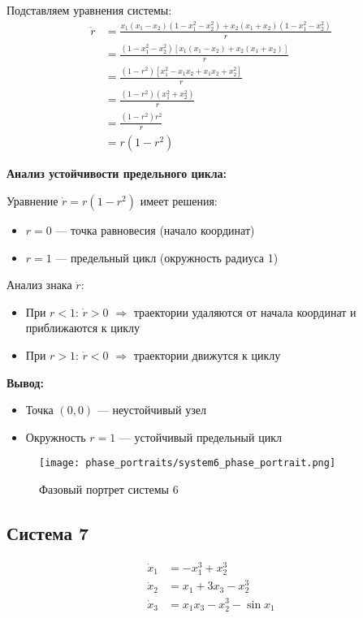 Подставляем уравнения системы:
\begin{align}
\dot{r} &= \frac{x_1(x_1 - x_2)(1 - x_1^2 - x_2^2) + x_2(x_1 + x_2)(1 - x_1^2 - x_2^2)}{r} \\\
&= \frac{(1 - x_1^2 - x_2^2)[x_1(x_1 - x_2) + x_2(x_1 + x_2)]}{r} \\\
&= \frac{(1 - r^2)[x_1^2 - x_1x_2 + x_1x_2 + x_2^2]}{r} \\\
&= \frac{(1 - r^2)(x_1^2 + x_2^2)}{r} \\\
&= \frac{(1 - r^2)r^2}{r} \\\
&= r(1 - r^2)
\end{align}

\textbf{Анализ устойчивости предельного цикла:}

Уравнение $\dot{r} = r(1 - r^2)$ имеет решения:
\begin{itemize}
\item $r = 0$ --- точка равновесия (начало координат)
\item $r = 1$ --- предельный цикл (окружность радиуса 1)
\end{itemize}

Анализ знака $\dot{r}$:
\begin{itemize}
\item При $r < 1$: $\dot{r} > 0$ $\Rightarrow$ траектории удаляются от начала координат и приближаются к циклу
\item При $r > 1$: $\dot{r} < 0$ $\Rightarrow$ траектории движутся к циклу
\end{itemize}

\textbf{Вывод:}
\begin{itemize}
\item Точка $(0,0)$ --- неустойчивый узел
\item Окружность $r = 1$ --- устойчивый предельный цикл
\end{itemize}

\begin{figure}[H]
\centering
\texttt{[image: phase\_portraits/system6\_phase\_portrait.png]}
\caption{Фазовый портрет системы 6}
\label{fig:system6_phase_portrait}
\end{figure}

\subsection*{Система 7}

\begin{align}
\dot{x}_1 &= -x_1^3 + x_2^3 \\
\dot{x}_2 &= x_1 + 3x_3 - x_2^3 \\
\dot{x}_3 &= x_1 x_3 - x_2^3 - \sin x_1
\end{align}

